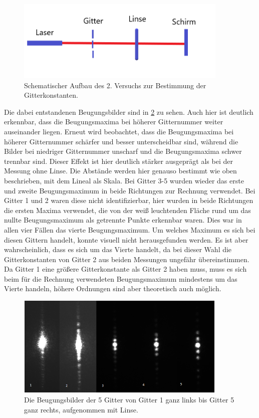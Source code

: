 \begin{figure}[h]
	\centering
	\includegraphics[width=0.9\textwidth]{Lana-Bild3}
	\caption{Schematischer Aufbau des 2. Versuchs zur Bestimmung der Gitterkonstanten.}
	\label{aufbaugitter2}
\end{figure}

Die dabei entstandenen Beugungsbilder sind in \cref{gitterfourier} zu sehen. Auch hier ist deutlich erkennbar, dass die Beugungsmaxima bei höherer Gitternummer weiter auseinander liegen. Erneut wird beobachtet, dass die Beugungsmaxima bei höherer Gitternummer schärfer und besser unterscheidbar sind, während die Bilder bei niedriger Gitternummer unscharf und die Beugungsmaxima schwer trennbar sind. Dieser Effekt ist hier deutlich stärker ausgeprägt als bei der Messung ohne Linse.
Die Abstände werden hier genauso bestimmt wie oben beschrieben, mit dem Lineal als Skala. Bei Gitter 3-5 wurden wieder das erste und zweite Beugungsmaximum in beide Richtungen zur Rechnung verwendet. Bei Gitter 1 und 2 waren diese nicht identifizierbar, hier wurden in beide Richtungen die ersten Maxima verwendet, die von der weiß leuchtenden Fläche rund um das nullte Beugungsmaximum als getrennte Punkte erkennbar waren. Dies war in allen vier Fällen das vierte Beugungsmaximum. Um welches Maximum es sich bei diesen Gittern handelt, konnte visuell nicht herausgefunden werden. Es ist aber wahrscheinlich, dass es sich um das Vierte handelt, da bei dieser Wahl die Gitterkonstanten von Gitter 2 aus beiden Messungen ungefähr übereinstimmen. Da Gitter 1 eine größere Gitterkonstante als Gitter 2 haben muss, muss es sich beim für die Rechnung verwendeten Beugungsmaximum mindestens um das Vierte handeln, höhere Ordnungen sind aber theoretisch auch möglich.

\begin{figure}[h]
	\centering
	\includegraphics[width=0.9\textwidth]{gitter_fourier.png}
	\caption{Die Beugungsbilder der 5 Gitter von Gitter 1 ganz links bis Gitter 5 ganz rechts, aufgenommen mit Linse.}
	\label{gitterfourier}
\end{figure}

